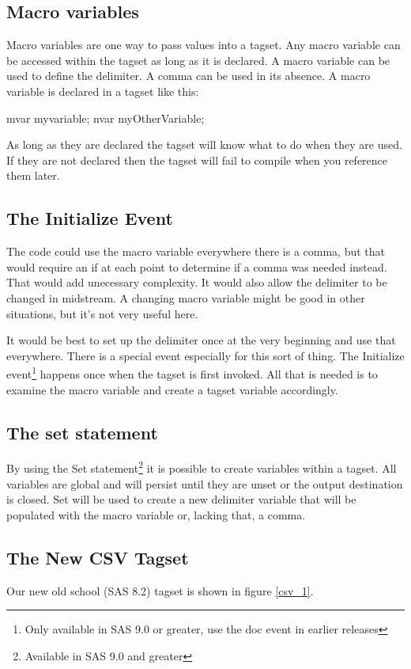 \subsection{Macro variables}
Macro variables are one way to pass values into a tagset.
Any macro variable can be accessed
within the tagset as long as it is declared.  A macro
variable can be used to define the delimiter.  A comma 
can be used in its absence.
A macro variable is declared in a tagset like this:
\begin{sfvcode}
  mvar myvariable;
  nvar myOtherVariable;
\end{sfvcode}
As long as they are declared the tagset will know what to do when
they are used.  If they are not declared then the tagset will fail to
compile when you reference them later.

\subsection{The Initialize Event}
The code could use the macro variable everywhere there is a comma, but
that would require an if at each point to determine if a comma 
was needed instead.  That would add unecessary complexity.  It
would also allow the delimiter to be changed in midstream.  A changing
macro variable might be good in other situations, but it's not very 
useful here.

It would be best to set up the delimiter once at the very beginning
and use that everywhere.  There is a special event especially for
this sort of thing.  The Initialize event\footnote{Only available in SAS 9.0
or greater, use the doc event in earlier releases} happens once when the tagset
is first invoked.  All that is needed is to examine the macro variable
and create a tagset variable accordingly.

\subsection{The set statement}
By using the Set statement\footnote{Available in SAS 9.0 and greater}
it is possible to create variables within a tagset.  All variables
are global and will persist until they are unset or the output destination
is closed.  Set will be used to create a new delimiter variable that
will be populated with the macro variable or, lacking that, a comma.

\subsection{The New CSV Tagset}        
Our new old school (SAS 8.2) tagset is shown in figure \vref{csv_1}.

